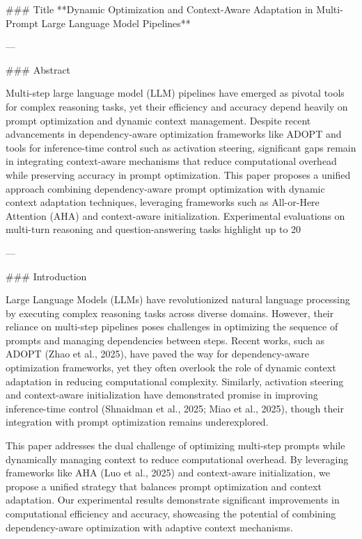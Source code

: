 ### Title
**Dynamic Optimization and Context-Aware Adaptation in Multi-Prompt Large Language Model Pipelines**

---

### Abstract

Multi-step large language model (LLM) pipelines have emerged as pivotal tools for complex reasoning tasks, yet their efficiency and accuracy depend heavily on prompt optimization and dynamic context management. Despite recent advancements in dependency-aware optimization frameworks like ADOPT and tools for inference-time control such as activation steering, significant gaps remain in integrating context-aware mechanisms that reduce computational overhead while preserving accuracy in prompt optimization. This paper proposes a unified approach combining dependency-aware prompt optimization with dynamic context adaptation techniques, leveraging frameworks such as All-or-Here Attention (AHA) and context-aware initialization. Experimental evaluations on multi-turn reasoning and question-answering tasks highlight up to 20%

---

### Introduction

Large Language Models (LLMs) have revolutionized natural language processing by executing complex reasoning tasks across diverse domains. However, their reliance on multi-step pipelines poses challenges in optimizing the sequence of prompts and managing dependencies between steps. Recent works, such as ADOPT (Zhao et al., 2025), have paved the way for dependency-aware optimization frameworks, yet they often overlook the role of dynamic context adaptation in reducing computational complexity. Similarly, activation steering and context-aware initialization have demonstrated promise in improving inference-time control (Shnaidman et al., 2025; Miao et al., 2025), though their integration with prompt optimization remains underexplored.

This paper addresses the dual challenge of optimizing multi-step prompts while dynamically managing context to reduce computational overhead. By leveraging frameworks like AHA (Luo et al., 2025) and context-aware initialization, we propose a unified strategy that balances prompt optimization and context adaptation. Our experimental results demonstrate significant improvements in computational efficiency and accuracy, showcasing the potential of combining dependency-aware optimization with adaptive context mechanisms.

